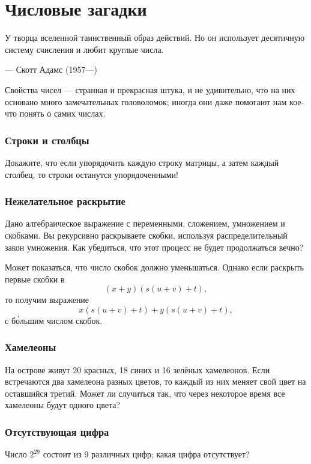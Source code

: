 \chapter{Числовые загадки}


\setlength{\epigraphwidth}{.85\textwidth}
\epigraph{У творца вселенной таинственный образ действий.
Но он использует десятичную систему счисления и любит круглые
числа.
}{--- Скотт Адамс (1957---)}


Свойства чисел --- странная и прекрасная штука, и не удивительно, что на них основано много замечательных головоломок; иногда они даже помогают нам кое-что понять о самих числах.

\subsection*{Строки и столбцы}

Докажите, что если упорядочить каждую строку матрицы, а затем каждый столбец, то строки останутся упорядоченными!

\subsection*{Нежелательное раскрытие}

Дано алгебраическое выражение с переменными, сложением, умножением и скобками.
Вы рекурсивно раскрываете скобки, используя распределительный закон умножения.
Как убедиться, что этот процесс не будет продолжаться вечно?

Может показаться, что число скобок должно уменьшаться.
Однако если раскрыть первые скобки в
\[(x + y)(s(u + v) + t),\]
то получим выражение
\[x(s(u + v) + t) + y(s(u + v) + t),\]
с б\'{о}льшим числом скобок.

\subsection*{Хамелеоны}

На острове живут 20 красных, 18 синих и 16 зелёных хамелеонов.
Если встречаются два хамелеона разных цветов, то каждый из них меняет свой цвет на оставшийся третий.
Может ли случиться так, что через некоторое время все хамелеоны будут одного цвета? 

\subsection*{Отсутствующая цифра}

Число $2^{29}$ состоит из $9$ различных цифр; какая цифра отсутствует?

